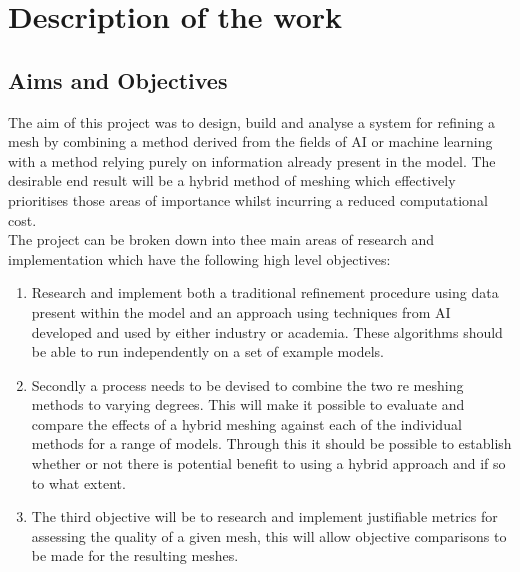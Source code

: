 
\section{Description of the work}
\subsection{Aims and Objectives}
The aim of this project was to design, build and analyse a system for refining a mesh by combining a method derived from the fields of AI or machine learning with a method relying purely on information already present in the model. The desirable end result will be a hybrid method of meshing which effectively prioritises those areas of importance whilst incurring a reduced computational cost.\\

\noindent
The project can be broken down into thee main areas of research and implementation which have the following high level objectives:\\ 

\begin{enumerate}[label=\Alph*]

\item Research and implement both a traditional refinement procedure using data present within the model and an approach using techniques from AI developed and used by either industry or academia. These algorithms should be able to run independently on a set of example models.

\item Secondly a process needs to be devised to combine the two re meshing methods to varying degrees. This will make it possible to evaluate and compare the effects of a hybrid meshing against each of the individual methods for a range of models. Through this it should be possible to establish whether or not there is potential benefit to using a hybrid approach and if so to what extent.

\item The third objective will be to research and implement justifiable metrics for assessing the quality of a given mesh, this will allow objective comparisons to be made for the resulting meshes.


\end{enumerate}


